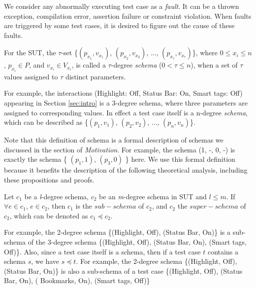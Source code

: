 We consider any abnormally executing test case as a \emph{fault}. It can be a thrown exception, compilation error, assertion failure or constraint violation. When faults are triggered by some test cases, it is desired to figure out the cause of these faults.


\begin{definition}\label{de:schema}
For the SUT, the $\tau$-set \{$(p_{x_{1}}, v_{x_{1}})$, $(p_{x_{2}}, v_{x_{2}})$, ..., $(p_{x_{\tau}}, v_{x_{\tau}})$\}, where $0 \leq x_{i} \leq n$, $p_{x_{i}} \in P$, and $v_{x_{i}} \in V_{x_{i}}$, is called a $\tau$-degree \emph{schema} ($0 < \tau \leq n $), when a set of $\tau$ values assigned to $\tau$ distinct parameters.
\end{definition}

For example, the interactions (Highlight: Off, Status Bar: On, Smart tags: Off) appearing in Section \ref{sec:intro} is a 3-degree schema, where three parameters are assigned to corresponding values. In effect a test case itself is a n-degree \emph{schema}, which can be described as \{$(p_{1}, v_{1})$, $(p_{2}, v_{2})$, ..., $(p_{n}, v_{n})$\}.

Note that this definition of schema is a formal description of schemas we discussed in the section of \emph{Motivation}. For example, the schema (1, -, 0, -) is exactly the schema \{ $(p_{1}, 1)$, $(p_{3}, 0)$ \} here. We use this formal definition because it benefits the description of the following theoretical analysis, including these propositions and proofs.

\begin{definition}\label{de:subsume}
Let $c_{1}$ be a \emph{l}-degree schema, $c_{2}$ be an \emph{m}-degree schema in SUT and $l \leq m $. If $\forall e \in c_{1}$, $e \in c_{2}$, then $c_{1}$ is the $sub-schema$ of $c_{2}$, and $c_{2}$ the $super-schema$ of $c_{2}$, which can be denoted as $c_{1} \preceq c_{2}$.
\end{definition}

For example,  the 2-degree schema \{(Highlight, Off), (Status Bar, On)\} is a sub-schema of the 3-degree schema \{(Highlight, Off), (Status Bar, On), (Smart tags, Off)\}. Also, since a test case itself is a schema, then if a test case $t$ contains a schema $s$, we have $s \preceq t$. For example,  the 2-degree schema \{(Highlight, Off), (Status Bar, On)\} is also a sub-schema of a test case \{(Highlight, Off), (Status Bar, On), ( Bookmarks, On), (Smart tags, Off)\}

